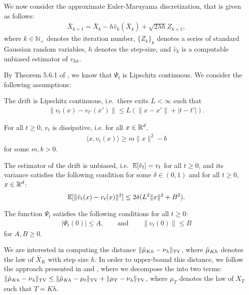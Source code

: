 We now consider the approximate Euler-Maruyama discretization, that is given as follows:
\begin{align}
\bar{X}_{k+1} = \bar{X}_k - h \hat{v}_k(\bar{X}_k) + \sqrt{2 \lambda h} Z_{k+1},
\end{align}
where $k \in \mathbb{N}_+$ denotes the iteration number, $\{Z_k\}_{k}$ denotes a series of standard Gaussian random variables, $h$ denotes the step-size, and $\hat{v}_k$ is a computable unbiased estimator of $v_{kh}$.


By Theorem 5.6.1 of \cite{bonnotte2013unidimensional}, we know that $\Psi_t$ is Lipschitz continuous. We consider the following assumptions:
\begin{assumption}
\label{asmp:lipschitz}
The drift is Lipschitz continuous, i.e.\ there exits $L < \infty$ such that
\begin{align}
\| v_t(x) - v_{t'}(x') \| \leq L ( \|x-x' \| + |t-t'|).
\end{align}
\end{assumption}
%
\begin{assumption}
\label{asmp:dissip}
For all $t \geq 0$, $v_t$ is dissipative, i.e. for all $x \in \mathbb{R}^d$.
\begin{align}
\langle x, v_t(x) \rangle \geq m \|x\|^2 -b
\end{align}
for some $m,b >0$.
\end{assumption}
%
\begin{assumption}
\label{asmp:stochgrad}
The estimator of the drift is unbiased, i.e.\ $\mathbb{E}[\hat{v}_t] = v_t$ for all $t \geq 0$, and its variance satisfies the following condition for some $\delta \in (0,1)$ and for all $t\geq 0$, $x \in \mathbb{R}^d$:
\begin{align}
\mathbb{E}[ \|\hat{v}_t(x) - v_t(x) \|^2] \leq 2 \delta(L^2 \|x\|^2 + B^2).
\end{align}
\end{assumption}
%
\begin{assumption}
\label{asmp:init_fun}
The function $\Psi_t$ satisfies the following conditions for all $t \geq 0$:
\begin{align}
|\Psi_t(0)| \leq A, \qquad \text{and} \qquad \|v_t(0)\| \leq B
\end{align}
for $A,B \geq 0$.
\end{assumption}


We are interested in computing the distance $\| \hat{\mu}_{Kh} - \nu_\lambda \|_{\textnormal{TV}}$, where $\hat{\mu}_{Kh}$ denotes the law of $\bar{X}_K$ with step size $h$. In order to upper-bound this distance, we follow the approach presented in \cite{dalalyan2017theoretical} and \cite{raginsky17a}, where we decompose the into two terms: $\| \hat{\mu}_{Kh} - \nu_\lambda \|_{\textnormal{TV}} \leq \| \hat{\mu}_{Kh} - \mu_t \|_{\textnormal{TV}} + \| \mu_{T} - \nu_\lambda \|_{\textnormal{TV}}$, where $\mu_T$ denotes the law of $X_T$ such that $T=Kh$. %

